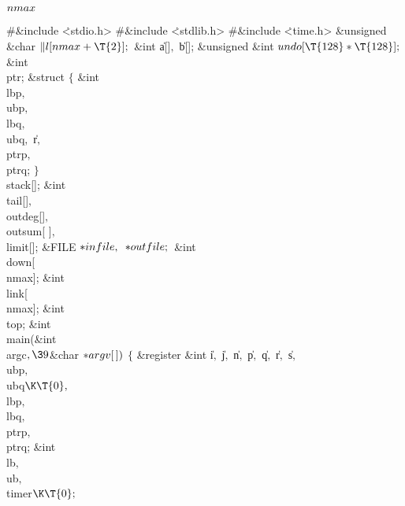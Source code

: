\Y\B\4\D$\\{nmax}$ \5
\par
\Y\B\8\#\&{include} \.{<stdio.h>}\6
\8\#\&{include} \.{<stdlib.h>}\6
\8\#\&{include} \.{<time.h>}\6
\&{unsigned} \&{char} ${}\|l[\\{nmax}+\T{2}];{}$\6
\&{int} \|a[]${},{}$ \|b[];\6
\&{unsigned} \&{int} ${}\\{undo}[\T{128}*\T{128}];{}$\6
\&{int} \\{ptr};\6
\&{struct} ${}\{{}$\1\6
\&{int} \\{lbp}${},{}$ \\{ubp}${},{}$ \\{lbq}${},{}$ \\{ubq}${},{}$ \|r${},{}$ %
\\{ptrp}${},{}$ \\{ptrq};\2\6
${}\}{}$ \\{stack}[];\6
\&{int} \\{tail}[]${},{}$ \\{outdeg}[]${},{}$ \\{outsum}[%
]${},{}$ \\{limit}[];\6
\&{FILE} ${}{*}\\{infile},{}$ ${}{*}\\{outfile};{}$\6
\&{int} \\{down}[\\{nmax}];\6
\&{int} \\{link}[\\{nmax}];\6
\&{int} \\{top};\7
\&{int} \\{main}(\&{int} \\{argc}${},\39{}$\&{char} ${}{*}\\{argv}[\,]){}$\1\1%
\2\2\6
${}\{{}$\1\6
\&{register} \&{int} \|i${},{}$ \|j${},{}$ \|n${},{}$ \|p${},{}$ \|q${},{}$ %
\|r${},{}$ \|s${},{}$ \\{ubp}${},{}$ \\{ubq}${}\K\T{0},{}$ \\{lbp}${},{}$ %
\\{lbq}${},{}$ \\{ptrp}${},{}$ \\{ptrq};\6
\&{int} \\{lb}${},{}$ \\{ub}${},{}$ \\{timer}${}\K\T{0};{}$\7
